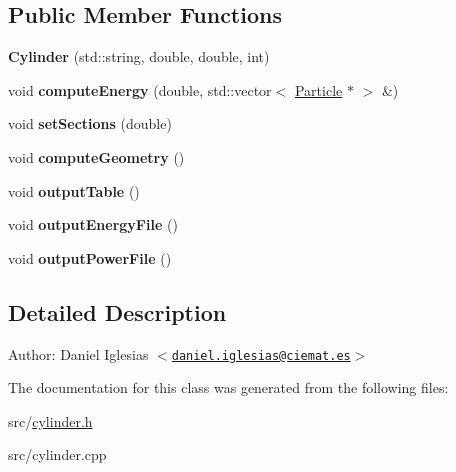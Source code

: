 \subsection*{Public Member Functions}
\begin{CompactItemize}
\item 
\hypertarget{classCylinder_01c84509dbd376b584fa10457fe83887}{
\textbf{Cylinder} (std::string, double, double, int)}
\label{classCylinder_01c84509dbd376b584fa10457fe83887}

\item 
\hypertarget{classCylinder_87e9b764e94ec9c521be15f830274d48}{
void \textbf{computeEnergy} (double, std::vector$<$ \hyperlink{classParticle}{Particle} $\ast$ $>$ \&)}
\label{classCylinder_87e9b764e94ec9c521be15f830274d48}

\item 
\hypertarget{classCylinder_d75a4b81272ef8b27b3163bf0aa49efd}{
void \textbf{setSections} (double)}
\label{classCylinder_d75a4b81272ef8b27b3163bf0aa49efd}

\item 
\hypertarget{classCylinder_657d003c8da54cb8d5cf78bbe210cafa}{
void \textbf{computeGeometry} ()}
\label{classCylinder_657d003c8da54cb8d5cf78bbe210cafa}

\item 
\hypertarget{classCylinder_33abcb99e6c881b867a0bb6c0dfcabae}{
void \textbf{outputTable} ()}
\label{classCylinder_33abcb99e6c881b867a0bb6c0dfcabae}

\item 
\hypertarget{classCylinder_15f4d90cc00191375d58051f56253ea7}{
void \textbf{outputEnergyFile} ()}
\label{classCylinder_15f4d90cc00191375d58051f56253ea7}

\item 
\hypertarget{classCylinder_92097fde3169a90bd2e6cd8fa9ca297e}{
void \textbf{outputPowerFile} ()}
\label{classCylinder_92097fde3169a90bd2e6cd8fa9ca297e}

\end{CompactItemize}


\subsection{Detailed Description}
\begin{Desc}
\item[Author:]Daniel Iglesias $<$\href{mailto:daniel.iglesias@ciemat.es}{\tt daniel.iglesias@ciemat.es}$>$ \end{Desc}


The documentation for this class was generated from the following files:\begin{CompactItemize}
\item 
src/\hyperlink{cylinder_8h}{cylinder.h}\item 
src/cylinder.cpp\end{CompactItemize}
